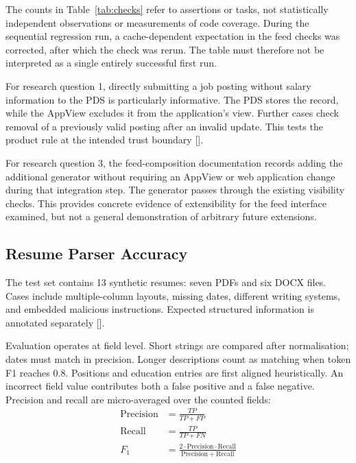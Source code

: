 \documentclass[11pt,a4paper]{article}
\newcommand{\reflink}[1]{\hyperlink{ref:#1}{#1}}
\newcommand{\refsep}{}
\newcommand{\refs}[1]{\begingroup
  \gdef\refsep{}%
  \renewcommand*{\do}[1]{\refsep\reflink{##1}\gdef\refsep{, }}%
  [\docsvlist{#1}]\endgroup}
\begin{document}
The counts in Table~\ref{tab:checks} refer to assertions or tasks, not statistically independent observations or measurements of code coverage. During the sequential regression run, a cache-dependent expectation in the feed checks was corrected, after which the check was rerun. The table must therefore not be interpreted as a single entirely successful first run.

For research question 1, directly submitting a job posting without salary information to the PDS is particularly informative. The PDS stores the record, while the AppView excludes it from the application's view. Further cases check removal of a previously valid posting after an invalid update. This tests the product rule at the intended trust boundary \refs{P9}.

For research question 3, the feed-composition documentation records adding the additional generator without requiring an AppView or web application change during that integration step. The generator passes through the existing visibility checks. This provides concrete evidence of extensibility for the feed interface examined, but not a general demonstration of arbitrary future extensions.

\subsection{Resume Parser Accuracy}

The test set contains 13 synthetic resumes: seven PDFs and six DOCX files. Cases include multiple-column layouts, missing dates, different writing systems, and embedded malicious instructions. Expected structured information is annotated separately \refs{P5}.

Evaluation operates at field level. Short strings are compared after normalisation; dates must match in precision. Longer descriptions count as matching when token F1 reaches 0.8. Positions and education entries are first aligned heuristically. An incorrect field value contributes both a false positive and a false negative. Precision and recall are micro-averaged over the counted fields:
\begin{align}
  \mathrm{Precision} &= \frac{TP}{TP + FP} \\
  \mathrm{Recall}    &= \frac{TP}{TP + FN} \\
  F_1                &= \frac{2 \cdot \mathrm{Precision} \cdot \mathrm{Recall}}{\mathrm{Precision} + \mathrm{Recall}}
\end{align}
\end{document}
